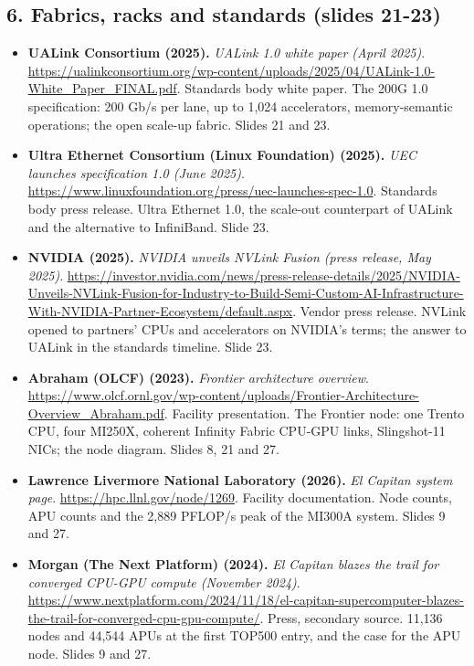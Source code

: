 \subsection*{6. Fabrics, racks and standards (slides 21-23)}
\begin{itemize}[leftmargin=1.2em,itemsep=3pt]\sloppy
\item \textbf{UALink Consortium (2025).} \textit{UALink 1.0 white paper (April 2025)}. \url{https://ualinkconsortium.org/wp-content/uploads/2025/04/UALink-1.0-White_Paper_FINAL.pdf}. Standards body white paper. The 200G 1.0 specification: 200 Gb/s per lane, up to 1,024 accelerators, memory-semantic operations; the open scale-up fabric. Slides 21 and 23.
\item \textbf{Ultra Ethernet Consortium (Linux Foundation) (2025).} \textit{UEC launches specification 1.0 (June 2025)}. \url{https://www.linuxfoundation.org/press/uec-launches-spec-1.0}. Standards body press release. Ultra Ethernet 1.0, the scale-out counterpart of UALink and the alternative to InfiniBand. Slide 23.
\item \textbf{NVIDIA (2025).} \textit{NVIDIA unveils NVLink Fusion (press release, May 2025)}. \url{https://investor.nvidia.com/news/press-release-details/2025/NVIDIA-Unveils-NVLink-Fusion-for-Industry-to-Build-Semi-Custom-AI-Infrastructure-With-NVIDIA-Partner-Ecosystem/default.aspx}. Vendor press release. NVLink opened to partners' CPUs and accelerators on NVIDIA's terms; the answer to UALink in the standards timeline. Slide 23.
\item \textbf{Abraham (OLCF) (2023).} \textit{Frontier architecture overview}. \url{https://www.olcf.ornl.gov/wp-content/uploads/Frontier-Architecture-Overview_Abraham.pdf}. Facility presentation. The Frontier node: one Trento CPU, four MI250X, coherent Infinity Fabric CPU-GPU links, Slingshot-11 NICs; the node diagram. Slides 8, 21 and 27.
\item \textbf{Lawrence Livermore National Laboratory (2026).} \textit{El Capitan system page}. \url{https://hpc.llnl.gov/node/1269}. Facility documentation. Node counts, APU counts and the 2,889 PFLOP/s peak of the MI300A system. Slides 9 and 27.
\item \textbf{Morgan (The Next Platform) (2024).} \textit{El Capitan blazes the trail for converged CPU-GPU compute (November 2024)}. \url{https://www.nextplatform.com/2024/11/18/el-capitan-supercomputer-blazes-the-trail-for-converged-cpu-gpu-compute/}. Press, secondary source. 11,136 nodes and 44,544 APUs at the first TOP500 entry, and the case for the APU node. Slides 9 and 27.
\end{itemize}
